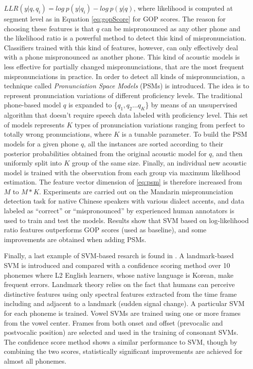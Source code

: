 $LLR(y|q,q_{i})=log \ p(y|q_{i}) - log \ p(y|q)$, where likelihood is computed at segment
level as in Equation \ref{eq:gopScore} for GOP scores. The reason for choosing these features is
that $q$ can be mispronounced as any other phone and the likelihood ratio is a powerful
method to detect this kind of mispronunciation. Classifiers trained with this kind of features, however, 
can only effectively deal with a phone mispronounced as another phone. This kind of acoustic models is 
less effective for partially changed mispronunciations, that are the most frequent mispronunciations
in practice. In order to detect all kinds of mispronunciation, a technique called  
\textit{Pronunciation Space Models} (PSMs) is introduced. The idea is to represent pronunciation variations
of different proficiency levels. The traditional phone-based model $q$ is expanded to 
\{$q_{1}, q_{2} \dotsc q_{K}$\} by means of an unsupervised algorithm that doesn't require
speech data labeled with proficiency level. 
This set of models represents $K$ types of pronunciation variations ranging from perfect to
totally wrong pronunciations, where $K$ is a tunable parameter. To build the PSM models for a
given phone $q$, all the instances are sorted according to their 
posterior probabilities obtained from the original acoustic model for $q$, and
then uniformly split into $K$ group of the same size. Finally, an individual new acoustic
model is trained with the observation from each group via maximum likelihood estimation.
The feature vector dimension of \ref{eq:psm} is therefore increased from $M$ to $M*K$.
Experiments are carried out on the 
Mandarin mispronunciation detection task for native Chinese speakers with various dialect accents, 
and data labeled as ``correct'' or ``mispronounced'' by experienced human annotators is used to train and test the models.
Results show that SVM based on log-likelihood ratio features outperforms GOP scores (used as baseline), and some
improvements are obtained when adding PSMs.

Finally, a last example of SVM-based resarch is found in \cite{landmark_svm, landmark_svm_2}. 
A landmark-based SVM is introduced and compared with a confidence 
scoring method over 10 phonemes where 
L2 English learners, whose native language is Korean, make frequent errors. 
Landmark theory relies on the fact that humans can perceive distinctive
features using only spectral features extracted from the time frame including and adjacent to
a landmark (sudden signal change). A particular SVM for each phoneme is trained. Vowel SVMs are 
trained using one or more frames from the vowel center. Frames from both onset and offset
(prevocalic and postvocalic position) are selected and used in the training of consonant
SVMs. The confidence score method shows a similar performance to SVM, though by combining 
the two scores, statistically significant improvements are achieved for almost all phonemes.

